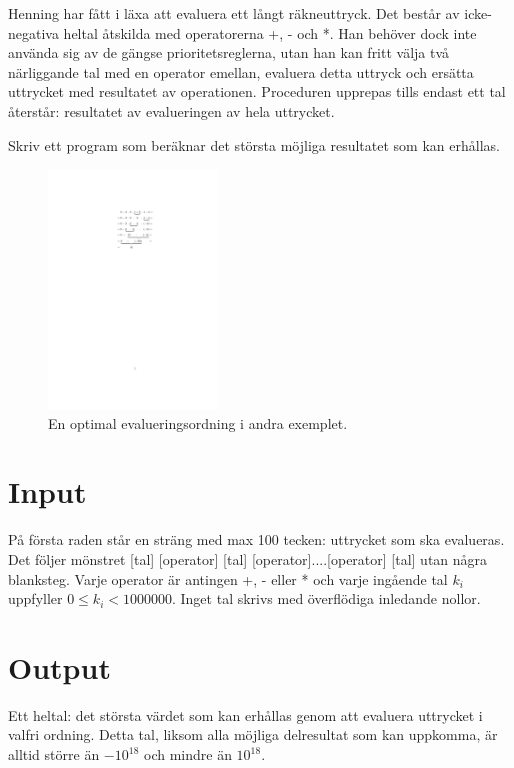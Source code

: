 
Henning har fått i läxa att evaluera ett långt räkneuttryck. Det består av icke-negativa heltal åtskilda med operatorerna +, - och *. Han behöver dock inte använda sig av de gängse prioritetsreglerna, utan han kan fritt välja två närliggande tal med en operator emellan, evaluera detta uttryck och ersätta uttrycket med resultatet av operationen. Proceduren upprepas tills endast ett tal återstår: resultatet av evalueringen av hela uttrycket.

Skriv ett program som beräknar det största möjliga resultatet som kan erhållas.

\begin{figure}[ht!]
\centering
\includegraphics[width=0.4\textwidth]{example.pdf}
\caption{En optimal evalueringsordning i andra exemplet.}
\label{overflow}
\end{figure}

\section*{Input}

På första raden står en sträng med max 100 tecken: uttrycket som ska evalueras. Det följer mönstret [tal] [operator] [tal] [operator]....[operator] [tal] utan några blanksteg. Varje operator är antingen +, - eller * och varje ingående tal $k_i$ uppfyller $0\leq k_i < 1000000$. Inget tal skrivs med överflödiga inledande nollor.

\section*{Output}

Ett heltal: det största värdet som kan erhållas genom att evaluera uttrycket i valfri ordning. Detta tal, liksom alla möjliga delresultat som kan uppkomma, är alltid större än $-10^{18}$ och mindre än $10^{18}$.


